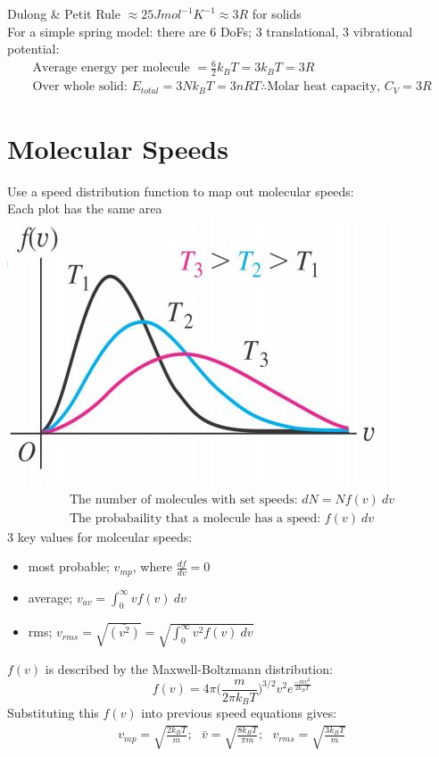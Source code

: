 \documentclass[a4paper, 11pt, normalem]{report}
\begin{document}
Dulong \& Petit Rule $\approx 25 J mol^{-1} K^{-1} \approx 3R$ for solids \\
For a simple spring model: there are 6 DoFs; 3 translational, 3 vibrational potential:
\begin{gather*}
	\text{Average energy per molecule } = \frac{6}{2}k_{B}T = 3k_{B}T = 3R \\
	\text{Over whole solid: } E_{total} = 3Nk_{B}T = 3nRT
	\therefore \text{Molar heat capacity, } C_{V} = 3R
\end{gather*}

\section{Molecular Speeds}
Use a speed distribution function to map out molecular speeds:\\
Each plot has the same area \\
\includegraphics[scale=0.85]{Distribution.jpg}
\begin{gather*}
	\text{The number of molecules with set speeds: } dN = Nf(v)~dv \\
	\text{The probabaility that a molecule has a speed: } f(v)~dv
\end{gather*}
3 key values for molceular speeds:
\begin{itemize}
	\item most probable; $v_{mp}$, where $\frac{df}{dv} = 0$
	\item average; $v_{av} = \int_{0}^{\infty} vf(v)~dv$
	\item rms; $v_{rms} = \sqrt{\bar{(v^{2})}} = \sqrt{\int_{0}^{\infty} v^{2}f(v)~dv}$
\end{itemize}
$f(v)$ is described by the Maxwell-Boltzmann distribution:
\begin{equation*}
	f(v) = 4{\pi}\bigg(\frac{m}{2{\pi}k_{B}T}\bigg)^{3/2}v^{2}e^{\frac{-mv^{2}}{2k_{B}T}}
\end{equation*}
Substituting this $f(v)$ into previous speed equations gives:
\begin{gather*}
	v_{mp} = \sqrt{\frac{2k_{B}T}{m}};~~~\bar{v} = \sqrt{\frac{8k_{B}T}{{\pi}m}};~~~v_{rms} = \sqrt{\frac{3k_{B}T}{m}}
\end{gather*}
\end{document}
